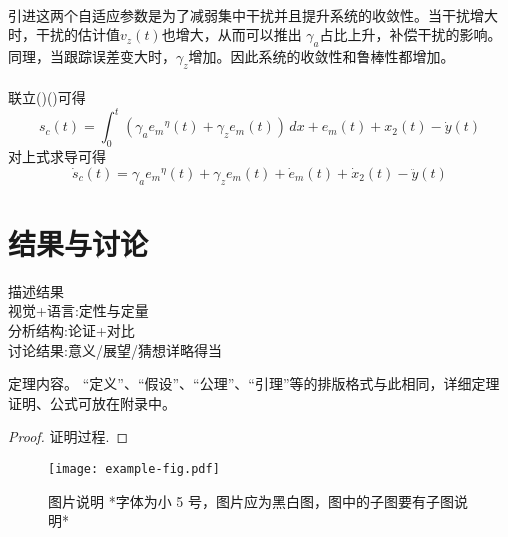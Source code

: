 \documentclass{cjc}
\begin{document}
    \paragraph{}引进这两个自适应参数是为了减弱集中干扰并且提升系统的收敛性。当干扰增大时，干扰的估计值$v_z(t)$也增大，从而可以推出
    $\gamma _a$占比上升，补偿干扰的影响。同理，当跟踪误差变大时，$\gamma _z $增加。因此系统的收敛性和鲁棒性都增加。
    \paragraph{}联立()()可得\:
    \begin{equation}
      s_c(t) = \int_{0}^{t} (\gamma_a{e_m}^\eta(t) + \gamma _z e_m(t))  \,dx + e_m(t) 
      + x_2(t) - \dot{y}(t)
    \end{equation}
    对上式求导可得\:
    \begin{equation}
      \dot{s}_c(t) = \gamma_a{e_m}^\eta(t) + \gamma _z e_m(t) + \dot{e}_m(t) + \dot{x}_2(t) - \ddot{y}(t)
    \end{equation}
    

 





\section{结果与讨论}
描述结果\:\\
视觉+语言:定性与定量\\
分析结构:论证+对比\\
讨论结果:意义/展望/猜想\(详略得当\)\\


\begin{theorem}
  定理内容。
  “定义”、“假设”、“公理”、“引理”等的排版格式与此相同，详细定理证明、公式可放在附录中。
\end{theorem}


\begin{proof}
  证明过程.
\end{proof}

\begin{figure}[htb]
  \centering
  \texttt{[image: example-fig.pdf]}
  \caption{图片说明 *字体为小 5 号，图片应为黑白图，图中的子图要有子图说明*}
\end{figure}
\end{document}
